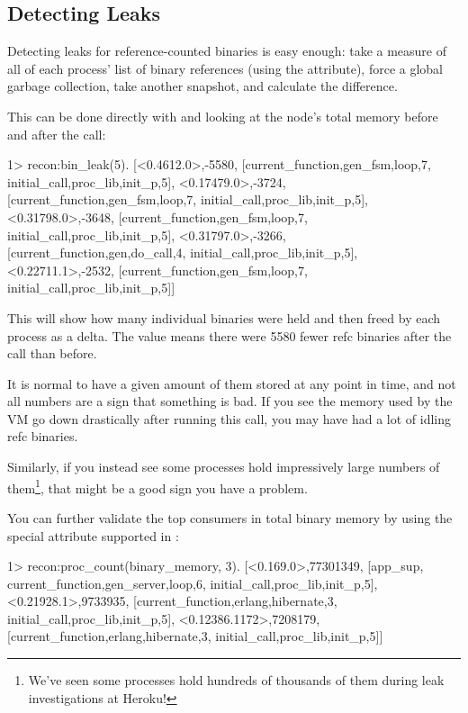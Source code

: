 \documentclass[11pt, oneside]{book}   	%
\begin{document}
\subsection{Detecting Leaks}

Detecting leaks for reference-counted binaries is easy enough: take a measure of all of each process' list of binary references (using the  attribute), force a global garbage collection, take another snapshot, and calculate the difference.

This can be done directly with  and looking at the node's total memory before and after the call:

\begin{VerbatimEshell}
1> recon:bin_leak(5).
[{<0.4612.0>,-5580,
  [{current_function,{gen_fsm,loop,7}},
   {initial_call,{proc_lib,init_p,5}}]},
 {<0.17479.0>,-3724,
  [{current_function,{gen_fsm,loop,7}},
   {initial_call,{proc_lib,init_p,5}}]},
 {<0.31798.0>,-3648,
  [{current_function,{gen_fsm,loop,7}},
   {initial_call,{proc_lib,init_p,5}}]},
 {<0.31797.0>,-3266,
  [{current_function,{gen,do_call,4}},
   {initial_call,{proc_lib,init_p,5}}]},
 {<0.22711.1>,-2532,
  [{current_function,{gen_fsm,loop,7}},
   {initial_call,{proc_lib,init_p,5}}]}]
\end{VerbatimEshell}

This will show how many individual binaries were held and then freed by each process as a delta. The value  means there were 5580 fewer refc binaries after the call than before.

It is normal to have a given amount of them stored at any point in time, and not all numbers are a sign that something is bad. If you see the memory used by the VM go down drastically after running this call, you may have had a lot of idling refc binaries.

Similarly, if you instead see some processes hold impressively large numbers of them\footnote{We've seen some processes hold hundreds of thousands of them during leak investigations at Heroku!}, that might be a good sign you have a problem.

You can further validate the top consumers in total binary memory by using the special  attribute supported in :

\begin{VerbatimEshell}
1> recon:proc_count(binary_memory, 3).
[{<0.169.0>,77301349,
  [app_sup,
   {current_function,{gen_server,loop,6}},
   {initial_call,{proc_lib,init_p,5}}]},
 {<0.21928.1>,9733935,
  [{current_function,{erlang,hibernate,3}},
   {initial_call,{proc_lib,init_p,5}}]},
 {<0.12386.1172>,7208179,
  [{current_function,{erlang,hibernate,3}},
   {initial_call,{proc_lib,init_p,5}}]}]
\end{VerbatimEshell}
\end{document}

